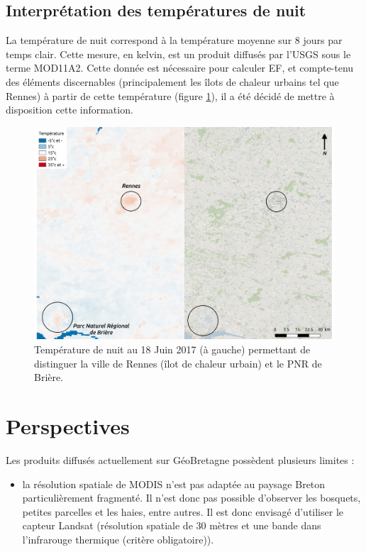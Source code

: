 \documentclass[10pt,a4paper]{article}
\begin{document}
\subsection{Interprétation des températures de nuit}

La température de nuit correspond à la température moyenne sur 8 jours par temps clair. Cette mesure, en kelvin, est un produit diffusés par l'USGS sous le terme MOD11A2. Cette donnée est nécessaire pour calculer EF, et compte-tenu des éléments discernables (principalement les îlots de chaleur urbains tel que Rennes) à partir de cette température (figure \ref{TN1}), il a été décidé de mettre à disposition cette information. \smallbreak \newpage

\begin{figure}[!h]
\centering
\includegraphics[scale=0.33]{img/TN_interpretation1.pdf}
\caption{Température de nuit au 18 Juin 2017 (à gauche) permettant de distinguer la ville de Rennes (îlot de chaleur urbain) et le PNR de Brière.}
\label{TN1}
\end{figure}

\section{Perspectives}

Les produits diffusés actuellement sur GéoBretagne possèdent plusieurs limites :
\begin{itemize}
\item la résolution spatiale de MODIS n'est pas adaptée au paysage Breton particulièrement fragmenté. Il n'est donc pas possible d'observer les bosquets, petites parcelles et les haies, entre autres. Il est donc envisagé d'utiliser le capteur Landsat (résolution spatiale de 30 mètres et une bande dans l'infrarouge thermique (critère obligatoire)).
\end{itemize}
\end{document}
